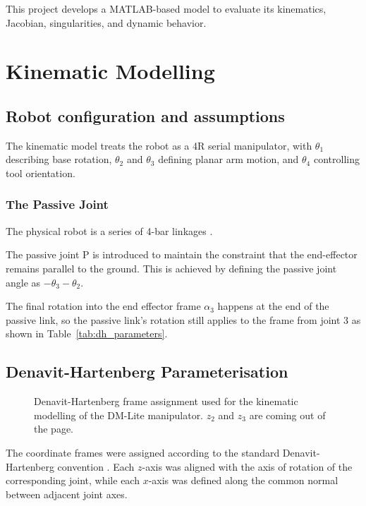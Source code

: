 \documentclass[12pt,a4paper]{article}
\begin{document}
This project develops a MATLAB-based model to evaluate its kinematics, Jacobian, singularities, and dynamic behavior.

\section{Kinematic Modelling}
\label{sec:kinematic_modelling}

\subsection{Robot configuration and assumptions}
The kinematic model treats the robot as a 4R serial manipulator, with
$\theta_1$ describing base rotation, $\theta_2$ and $\theta_3$ defining planar
arm motion, and $\theta_4$ controlling tool orientation.

\subsubsection{The Passive Joint}
\label{subsec:passive_joint}

The physical robot is a series of 4-bar linkages \cite{cmuSimulation2022}. 

The passive joint P is introduced to maintain the constraint that the
end-effector remains parallel to the ground. This is achieved by defining the
passive joint angle as $-\theta_3-\theta_2$.

The final rotation into the end effector frame $\alpha_3$
happens at the end of the passive link, so the passive link's rotation still
applies to the frame from joint 3 as shown in Table~\ref{tab:dh_parameters}.


\subsection{Denavit-Hartenberg Parameterisation}

\begin{figure}[htbp]
    \centering
    
    \caption{Denavit-Hartenberg frame assignment used for the kinematic
    modelling of the DM-Lite manipulator. $z_2$ and $z_3$ are coming
    out of the page.}
\end{figure}
\vspace{-0.2cm}


The coordinate frames were assigned according to the standard
Denavit-Hartenberg convention \cite{siciliano2009}. Each $z$-axis was aligned
with the axis of rotation of the corresponding joint, while each $x$-axis was
defined along the common normal between adjacent joint axes. 
\end{document}
